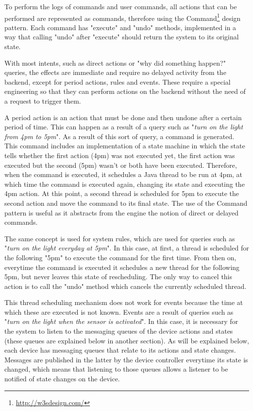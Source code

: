 \documentclass[runningheads]{llncs}
\begin{document}
To perform the logs of commands and user commands, all actions that can be performed are represented as commands, therefore using the Command\footnote{\url{http://w3sdesign.com/}} design pattern. Each command has "execute" and "undo" methods, implemented in a way that calling "undo" after "execute" should return the system to its original state.

With most intents, such as direct actions or "why did something happen?" queries, the effects are immediate and require no delayed activity from the backend, except for period actions, rules and events. These require a special engineering so that they can perform actions on the backend without the need of a request to trigger them.

A period action is an action that must be done and then undone after a certain period of time. This can happen as a result of a query such as "\textit{turn on the light from 4pm to 5pm}". As a result of this sort of query, a command is generated. This command includes an implementation of a state machine in which the state tells whether the first action (4pm) was not executed yet, the first action was executed but the second (5pm) wasn't or both have been executed. Therefore, when the command is executed, it schedules a Java thread to be run at 4pm, at which time the command is executed again, changing its state and executing the 4pm action. At this point, a second thread is scheduled for 5pm to execute the second action and move the command to its final state. The use of the Command pattern is useful as it abstracts from the engine the notion of direct or delayed commands.

The same concept is used for system rules, which are used for queries such as "\textit{turn on the light everyday at 5pm}". In this case, at first, a thread is scheduled for the following "5pm" to execute the command for the first time. From then on, everytime the command is executed it schedules a new thread for the following 5pm, but never leaves this state of rescheduling. The only way to cancel this action is to call the "undo" method which cancels the currently scheduled thread.

This thread scheduling mechanism does not work for events because the time at which these are executed is not known. Events are a result of queries such as "\textit{turn on the light when the sensor is activated}". In this case, it is necessary for the system to listen to the messaging queues of the device actions and states (these queues are explained below in another section). As will be explained below, each device has messaging queues that relate to its actions and state changes. Messages are published in the latter by the device controller everytime its state is changed, which means that listening to those queues allows a listener to be notified of state changes on the device.
\end{document}
